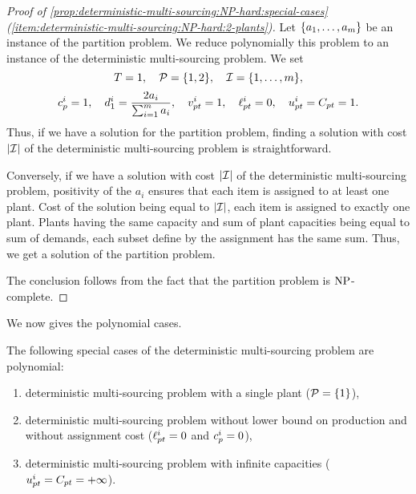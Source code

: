 \begin{proof}[Proof of \cref{prop:deterministic-multi-sourcing:NP-hard:special-cases} (\cref{item:deterministic-multi-sourcing:NP-hard:2-plants})]
Let $\crbracket{a_1,\ldots,a_m}$ be an instance of the partition problem.
We reduce polynomially this problem to an instance of the deterministic multi-sourcing problem.
We set
$$
  \horizon=1
  ,\quad
  \plants=\crbracket{1,2}
  ,\quad
  \REF=\range[1]{m},
$$
$$
  c_p^i=1
  ,\quad
  d_1^i=\frac{2a_i}{\sum_{i=1}^{m}a_i}
  ,\quad
  v_{pt}^i=1
  ,\quad
  \ell_{pt}^i=0
  ,\quad
  u_{pt}^i=C_{pt}=1.
$$
Thus, if we have a solution for the partition problem, finding a solution with cost $\card{\REF}$ of the deterministic multi-sourcing problem is straightforward.


Conversely, if we have a solution with cost $\card{\REF}$ of the deterministic multi-sourcing problem, positivity of the $a_i$ ensures that each item is assigned to at least one plant.
Cost of the solution being equal to $\card{\REF}$, each item is assigned to exactly one plant.
Plants having the same capacity and sum of plant capacities being equal to sum of demands, each subset define by the assignment has the same sum.
Thus, we get a solution of the partition problem.


The conclusion follows from the fact that the partition problem is $\operatorname{NP}$-complete.
\end{proof}


We now gives the polynomial cases.


\begin{prop}\label{prop:deterministic-multi-sourcing:polynomial-cases}
The following special cases of the deterministic multi-sourcing problem are polynomial:
\begin{enumerate}
  \item deterministic multi-sourcing problem with a single plant ($\plants=\crbracket{1}$),
  \item deterministic multi-sourcing problem without lower bound on production and without assignment cost ($\ell_{pt}^i=0$ and $c_p^i=0$),
  \item deterministic multi-sourcing problem with infinite capacities ($u_{pt}^i=C_{pt}=+\infty$).
\end{enumerate}
\end{prop}


